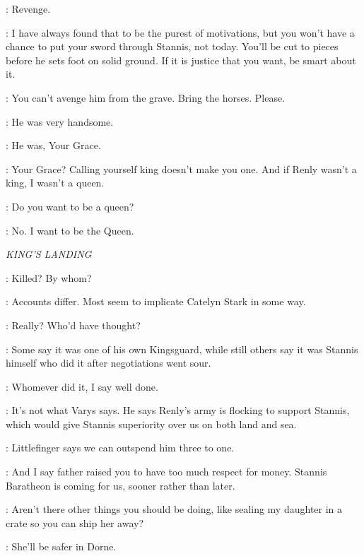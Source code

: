 \LORAS: Revenge. 

\LITTLEFINGER: I have always found that to be the purest of motivations, but you won't have a chance to put your sword through Stannis, not today. You'll be cut to pieces before he sets foot on solid ground. If it is justice that you want, be smart about it. 

\MARGAERY: You can't avenge him from the grave. Bring the horses. Please. 



\MARGAERY: He was very handsome. 

\LITTLEFINGER: He was, Your Grace. 

\MARGAERY: Your Grace? Calling yourself king doesn't make you one. And if Renly wasn't a king, I wasn't a queen. 

\LITTLEFINGER: Do you want to be a queen? 

\MARGAERY: No. I want to be the Queen. 



\scene

\textit{KING'S LANDING} 


\CERSEI: Killed? By whom? 

\TYRION: Accounts differ. Most seem to implicate Catelyn Stark in some way. 

\CERSEI: Really? Who'd have thought? 

\TYRION: Some say it was one of his own Kingsguard, while still others say it was Stannis himself who did it after negotiations went sour. 

\CERSEI: Whomever did it, I say well done. 

\TYRION: It's not what Varys says. He says Renly's army is flocking to support Stannis, which would give Stannis superiority over us on both land and sea. 

\CERSEI: Littlefinger says we can outspend him three to one. 

\TYRION: And I say father raised you to have too much respect for money. Stannis Baratheon is coming for us, sooner rather than later. 

\CERSEI: Aren't there other things you should be doing, like sealing my daughter in a crate so you can ship her away? 

\TYRION: She'll be safer in Dorne. 

